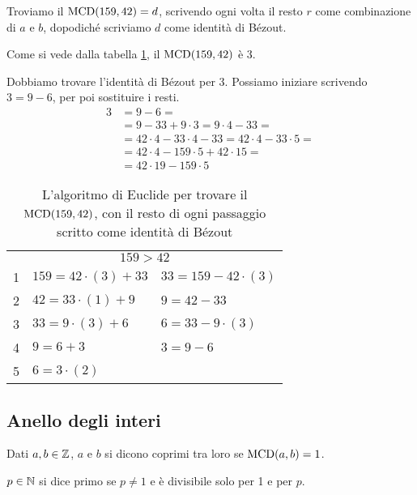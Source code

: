 \begin{exmp}
Troviamo il $\operatorname{MCD}(159, 42) = d$, scrivendo ogni volta il resto $r$ come combinazione di $a$ e $b$, dopodich\'e scriviamo $d$ come identit\`a di B\'ezout.

Come si vede dalla tabella \ref{tab:esempio_algoritmo_euclide}, il $\operatorname{MCD}(159, 42) $ \`e $ 3$.

Dobbiamo trovare l'identit\`a di B\'ezout per 3. Possiamo iniziare scrivendo $3 = 9 - 6$, per poi sostituire i resti.
\begin{align*}
3 &= 9 - 6 = \\
&= 9 - 33 + 9 \cdot 3 = 9 \cdot 4 - 33 = \\
&= 42 \cdot 4 - 33 \cdot 4 - 33 = 42 \cdot 4 - 33 \cdot 5 = \\
&= 42 \cdot 4 - 159 \cdot 5 + 42 \cdot 15 = \\
&= 42 \cdot 19 - 159 \cdot 5
\end{align*}
\end{exmp}

\begin{table}[ht]
\centering
\begin{tabular}{*{3}{l}}
\multicolumn{3}{c}{$159 > 42$} \\
1 & $159 = 42 \cdot (3) + 33$     & $33 = 159 - 42 \cdot (3)$ \\ 
2 & $42 = 33 \cdot (1) + 9$       & $9 = 42 - 33$ \\
3 & $33 = 9 \cdot (3) + 6$        & $6 = 33 - 9 \cdot (3)$ \\
4 & $9 = 6 + 3$             & $3 = 9 - 6$ \\
5 & $6 = 3 \cdot (2)$ & \
\end{tabular}
\caption{\label{tab:esempio_algoritmo_euclide}L'algoritmo di Euclide per trovare il $\operatorname{MCD}(159, 42)$, con il resto di ogni passaggio scritto come identit\`a di B\'ezout}
\end{table}

\subsection{Anello degli interi}

\begin{defn}
Dati $a, b \in \mathbb{Z}$, $a$ e $b$ si dicono coprimi tra loro se $\operatorname{MCD}(a,b) = 1$.
\end{defn}
\begin{defn}
$p \in \mathbb{N}$ si dice primo se $p \neq 1$ e \`e divisibile solo per 1 e per $p$.
\end{defn}

